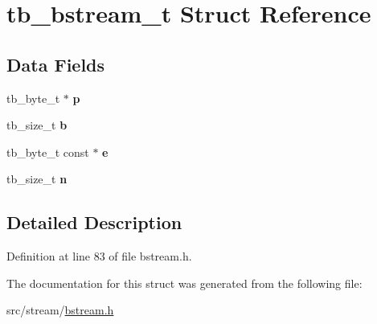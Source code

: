 \hypertarget{structtb__bstream__t}{\section{tb\-\_\-bstream\-\_\-t Struct Reference}
\label{structtb__bstream__t}
}
\subsection*{Data Fields}
\begin{DoxyCompactItemize}
\item 
\hypertarget{structtb__bstream__t_ade9ea4994425164460f1b343dc7a91c0}{tb\-\_\-byte\-\_\-t $\ast$ {\bfseries p}}\label{structtb__bstream__t_ade9ea4994425164460f1b343dc7a91c0}

\item 
\hypertarget{structtb__bstream__t_a5567c9514b21f2bd36240662fadc1f58}{tb\-\_\-size\-\_\-t {\bfseries b}}\label{structtb__bstream__t_a5567c9514b21f2bd36240662fadc1f58}

\item 
\hypertarget{structtb__bstream__t_a7422d3bbc4bdf5bb7d279bd060e7e602}{tb\-\_\-byte\-\_\-t const $\ast$ {\bfseries e}}\label{structtb__bstream__t_a7422d3bbc4bdf5bb7d279bd060e7e602}

\item 
\hypertarget{structtb__bstream__t_ab8109a458b8c5b31e007d3a2fe05d5b4}{tb\-\_\-size\-\_\-t {\bfseries n}}\label{structtb__bstream__t_ab8109a458b8c5b31e007d3a2fe05d5b4}

\end{DoxyCompactItemize}


\subsection{Detailed Description}


Definition at line 83 of file bstream.\-h.



The documentation for this struct was generated from the following file\-:\begin{DoxyCompactItemize}
\item 
src/stream/\hyperlink{bstream_8h}{bstream.\-h}\end{DoxyCompactItemize}
